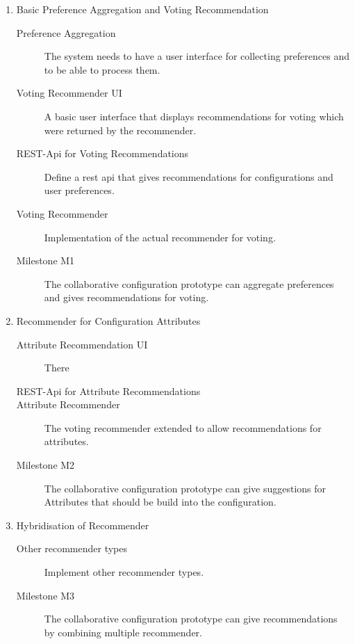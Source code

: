 \begin{enumerate}[label=Work Package \arabic*:, align=left]
    \item Basic Preference Aggregation and Voting Recommendation
        \begin{description}
            \item[Preference Aggregation] The system needs to have a user interface for collecting preferences and to be able to process them.
            \item[Voting Recommender UI] A basic user interface that displays recommendations for voting which were returned by the recommender.
            \item[REST-Api for Voting Recommendations] Define a rest api that gives recommendations for configurations and user preferences.
            \item[Voting Recommender] Implementation of the actual recommender for voting.
            \item[Milestone M1] The collaborative configuration prototype can aggregate preferences and gives recommendations for voting.
        \end{description}
    \pagebreak[3]
    \item Recommender for Configuration Attributes
    \begin{description}
        \item[Attribute Recommendation UI] There 
        \item[REST-Api for Attribute Recommendations]
        \item[Attribute Recommender] The voting recommender extended to allow recommendations for attributes.
        \item[Milestone M2] The collaborative configuration prototype can give suggestions for Attributes that should be build into the configuration. 
    \end{description}
    \pagebreak[3]
    \item Hybridisation of Recommender
    \begin{description}
        \item[Other recommender types] Implement other recommender types. 
        \item[Milestone M3] The collaborative configuration prototype can give recommendations by combining multiple recommender.
    \end{description}
    \pagebreak[3]
\end{enumerate}



